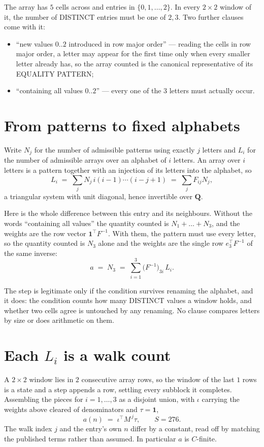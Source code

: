 \documentclass[11pt,a4paper]{article}
\theoremstyle{plain}
\theoremstyle{definition}
\begin{document}
The array has $5$ cells across and entries in $\{0,1,\dots,2\}$. In every
$2\times2$ window of it, the number of DISTINCT entries must be one of $2, 3$. Two
further clauses come with it:

\begin{itemize}
\item ``new values $0..2$ introduced in row major order'' --- reading the cells in row major
order, a letter may appear for the first time only when every smaller letter already has, so
the array counted is the canonical representative of its EQUALITY PATTERN;
\item ``containing all values $0..2$'' --- every one of the $3$ letters must actually
occur.
\end{itemize}


\section{From patterns to fixed alphabets}

Write $N_j$ for the number of admissible patterns using exactly $j$ letters and $L_i$ for the
number of admissible arrays over an alphabet of $i$ letters. An array over $i$ letters is a
pattern together with an injection of its letters into the alphabet, so
\[
L_i\;=\;\sum_{j} N_j\,i(i-1)\cdots(i-j+1)\;=\;\sum_j F_{ij}N_j ,
\]
a triangular system with unit diagonal, hence invertible over $\mathbf{Q}$.

Here is the whole difference between this entry and its neighbours. Without the words
``containing all values'' the quantity counted is $N_1+\dots+N_{3}$, and the weights are
the row vector $\mathbf{1}^{\!\top}F^{-1}$. With them, the pattern must use every letter,
so the quantity counted is $N_{3}$ alone and the weights are the single row
$e_{3}^{\!\top}F^{-1}$ of the same inverse:
\[
a\;=\;N_{3}\;=\;\sum_{i=1}^{3}\bigl(F^{-1}\bigr)_{3i}\,L_i .
\]

The step is legitimate only if the condition survives renaming the alphabet, and it does: the
condition counts how many DISTINCT values a window holds, and whether two cells agree is
untouched by any renaming. No clause compares letters by size or does arithmetic on them.

\section{Each $L_i$ is a walk count}

A $2\times2$ window lies in $2$ consecutive array rows, so the window of the last
$1$ rows is a state and a step appends a row, settling every subblock it completes.
Assembling the pieces for $i=1,\dots,3$ as a disjoint union, with $\iota$ carrying the
weights above cleared of denominators and $\tau=\mathbf{1}$,
\[
a(n)\;=\;\iota^{\!\top}M^{\,j}\tau ,\qquad S=276.
\]
The walk index $j$ and the entry's own $n$ differ by a constant, read off by matching the
published terms rather than assumed. In particular $a$ is $C$-finite.
\end{document}
